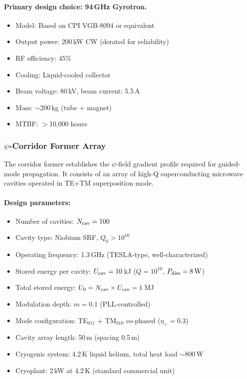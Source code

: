 \documentclass[11pt,a4paper]{article}
\begin{document}
\paragraph{Primary design choice: 94\,GHz Gyrotron.}
\begin{itemize}
\item Model: Based on CPI VGB-8094 or equivalent
\item Output power: 200\,kW CW (derated for reliability)
\item RF efficiency: 45\%
\item Cooling: Liquid-cooled collector
\item Beam voltage: 80\,kV, beam current: 5.5\,A
\item Mass: $\sim$200\,kg (tube + magnet)
\item MTBF: $>$10{,}000 hours
\end{itemize}

\subsubsection{$\psi$-Corridor Former Array}

The corridor former establishes the $\psi$-field gradient profile
required for guided-mode propagation. It consists of an array of
high-Q superconducting microwave cavities operated in TE+TM
superposition mode.

\paragraph{Design parameters:}
\begin{itemize}
\item Number of cavities: $N_{\rm cav} = 100$
\item Cavity type: Niobium SRF, $Q_0 > 10^{10}$
\item Operating frequency: 1.3\,GHz (TESLA-type, well-characterized)
\item Stored energy per cavity: $U_{\rm cav} = 10$\,kJ ($Q = 10^{10}$, $P_{\rm diss} = 8\,\text{W}$)
\item Total stored energy: $U_0 = N_{\rm cav} \times U_{\rm cav} = 1$\,MJ
\item Modulation depth: $m = 0.1$ (PLL-controlled)
\item Mode configuration: TE$_{011}$ + TM$_{010}$ co-phased ($\eta_\times = 0.3$)
\item Cavity array length: 50\,m (spacing 0.5\,m)
\item Cryogenic system: 4.2\,K liquid helium, total heat load $\sim$800\,W
\item Cryoplant: 2\,kW at 4.2\,K (standard commercial unit)
\end{itemize}
\end{document}
